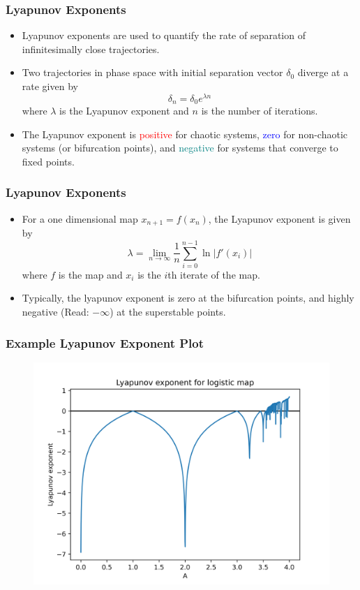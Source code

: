\documentclass[
	11pt, %
	aspectratio=169, %
]{beamer}
\begin{document}

\begin{frame}
	\frametitle{Lyapunov Exponents}
    \begin{itemize}
        \item Lyapunov exponents are used to quantify the rate of separation of infinitesimally close trajectories. \pause
        \item Two trajectories in phase space with initial separation vector $\delta_0$ diverge at a rate given by 
        \begin{equation}
            \delta_n = \delta_0 e^{\lambda n}
        \end{equation}
        where $\lambda$ is the Lyapunov exponent and $n$ is the number of iterations. \pause
        \item The Lyapunov exponent is \textcolor{red}{positive} for chaotic systems, \textcolor{blue}{zero} for non-chaotic systems (or bifurcation points), and \textcolor{teal}{negative} for systems that converge to fixed points.
    \end{itemize}
\end{frame}


\begin{frame}
	\frametitle{Lyapunov Exponents}
    \begin{itemize}
        \item For a one dimensional map $x_{n+1} = f(x_n)$, the Lyapunov exponent is given by
        \begin{equation}
            \lambda = \lim_{n \to \infty} \frac{1}{n} \sum_{i=0}^{n-1} \ln \left| f'(x_i) \right|
        \end{equation}
        where $f$ is the map and $x_i$ is the $i$th iterate of the map. \pause
        \item Typically, the lyapunov exponent is zero at the bifurcation points, and highly negative (Read: $-\infty$) at the superstable points.
    \end{itemize}
\end{frame}


\begin{frame}
	\frametitle{Example Lyapunov Exponent Plot}
    \begin{figure}
        \includegraphics[width=0.6\linewidth]{logistic_lyapunov_exp.png}
    \end{figure}
\end{frame}
\end{document}
